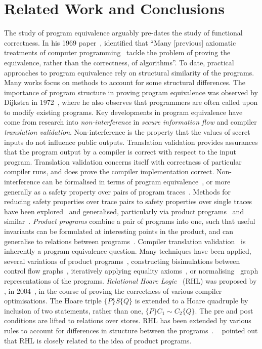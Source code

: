 \documentclass[runningheads,a4paper]{llncs}
\begin{document}
\section{Related Work and Conclusions}\label{sec:related}
The study of program equivalence arguably pre-dates the study of functional correctness. In his 1969 paper~\cite{Hoare1969}, \citeauthor{Hoare1969} identified that ``Many [previous] axiomatic treatments of computer programming~\cite{Yanov1958,Igarishi1964,DeBarker1968} tackle the problem of proving the equivalence, rather than the correctness, of algorithms''. To date, practical approaches to program equivalence rely on structural similarity of the programs. Many works focus on methods to account for some structural differences. The importance of program structure in proving program equivalence was observed by Dijkstra in 1972~\cite{Dahl1972}, where he also observes that programmers are often called upon to modify existing programs.
Key developments in program equivalence have come from research into \emph{non-interference} in \emph{secure information flow} and compiler \emph{translation validation}. Non-interference is the property that the values of secret inputs do not influence public outputs. Translation validation provides assurances that the program output by a compiler is correct with respect to the input program. Translation validation concerns itself with correctness of particular compiler runs, and does prove the compiler implementation correct.
Non-interference can be formalised in terms of program equivalence~\cite{Joshi2000}, or more generally as a safety property over pairs of program traces~\cite{Barthe2004,Terauchi2005}.  Methods for reducing safety properties over trace pairs to safety properties over single traces have been explored~\cite{Leino2008a,Benton2006} and generalised, particularly via product programs~\cite{Barthe2011,Barthe2013} and similar~\cite{Zaks2008,Stepp11,Tristan11}. \emph{Product programs} combine a pair of programs into one, such that useful invariants can be formulated at interesting points in the product, and can generalise to relations between programs~\cite{Barthe2016}.
Compiler translation validation~\cite{Kundu09,Stepp11,Tristan11,Le2014,Zaks2008} is inherently a program equivalence question. Many techniques have been applied, several variations of product programs~\cite{Zaks2008}, constructing bisimulations between control flow graphs~\cite{Kundu09}, iteratively applying equality axioms~\cite{Stepp11}, or normalising~\cite{Tristan11} graph representations of the programs.
\emph{Relational Hoare Logic}~\cite{Benton2004,Benton2007,Yang2007,Beringer2011,Barthe2016} (RHL) was proposed by \citeauthor{Benton2004}, in 2004~\cite{Benton2004}, in the course of proving the correctness of various compiler optimisations. The Hoare triple $\{P\} S \{Q\}$ is extended to a Hoare quadruple by inclusion of two statements, rather than one, $\{P\} C_1 \sim C_2 \{Q\}$. The pre and post conditions are lifted to relations over stores. RHL has been extended by various rules to account for differences in structure between the programs~\cite{Benton2004,Barthe2016}. \citeauthor{Barthe2016}~\cite{Barthe2016} pointed out that RHL is closely related to the idea of product programs.
\end{document}
